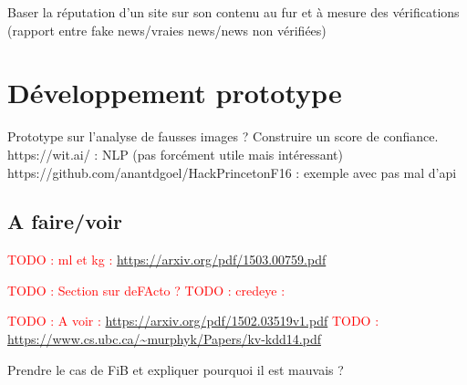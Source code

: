 \documentclass[12pt]{article}
\newcommand\todo[1]{\textcolor{red}{TODO : #1}}
\begin{document}
Baser la réputation d'un site sur son contenu au fur et à mesure des vérifications (rapport entre fake news/vraies news/news non vérifiées)

\section{Développement prototype}

Prototype sur l'analyse de fausses images ? 
Construire un score de confiance.
https://wit.ai/ : NLP (pas forcément utile mais intéressant)
https://github.com/anantdgoel/HackPrincetonF16 : exemple avec pas mal d'api

\subsection{A faire/voir}

\todo{ml et kg : \url{https://arxiv.org/pdf/1503.00759.pdf}}

\todo{Section sur deFActo ? \cite{gerber2015}}
\todo{credeye : \cite{popat2018credeye}}

\todo{A voir : \url{https://arxiv.org/pdf/1502.03519v1.pdf}}
\todo{\url{https://www.cs.ubc.ca/~murphyk/Papers/kv-kdd14.pdf}}

Prendre le cas de FiB et expliquer pourquoi il est mauvais ?

\clearpage

\printbibliography[
heading=bibintoc,
title={Bibliographie}
]

\clearpage


\end{document}
